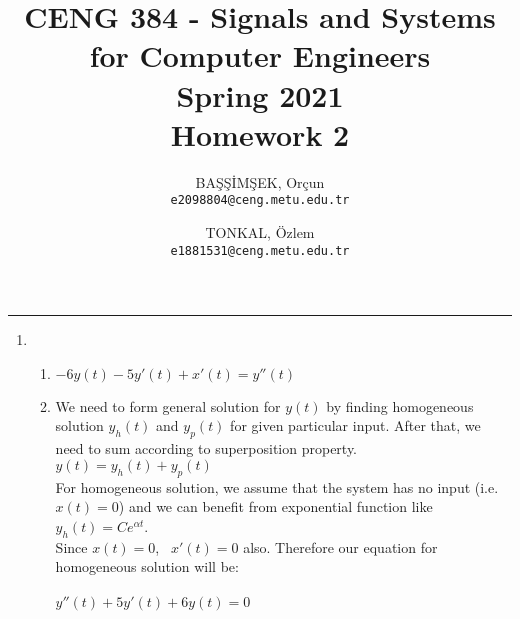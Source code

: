 \documentclass[10pt,a4paper, margin=1in]{article}
\author{
  BAŞŞİMŞEK, Orçun\\
  \texttt{e2098804@ceng.metu.edu.tr}
  \and
  TONKAL, Özlem\\
  \texttt{e1881531@ceng.metu.edu.tr}
}
\title{CENG 384 - Signals and Systems for Computer Engineers \\
Spring 2021 \\
Homework 2}
\begin{document}
\maketitle



\noindent\rule{19cm}{1.2pt}

\begin{enumerate}

\item %
    \begin{enumerate}
    \item %
    $-6y(t) - 5y'(t) + x'(t) = y''(t)$
    \item %
    We need to form general solution for $y(t)$ by finding homogeneous solution $y_h(t)$ and $y_p(t)$ for given particular input. After that, we need to sum according to superposition property. \\
    
    $y(t) = y_h(t) + y_p(t)$ \\
    
    For homogeneous solution, we assume that the system has no input (i.e. $x(t) = 0$) and we can benefit from exponential function like $y_h(t) = C e^{\alpha t}$. \\
    Since $x(t) = 0$, \ $x'(t) = 0$ also. Therefore our equation for homogeneous solution will be: \\
    \\
    $y''(t) + 5y'(t) + 6y(t) = 0$  \\
    

\end{enumerate}
\end{enumerate}
\end{document}
